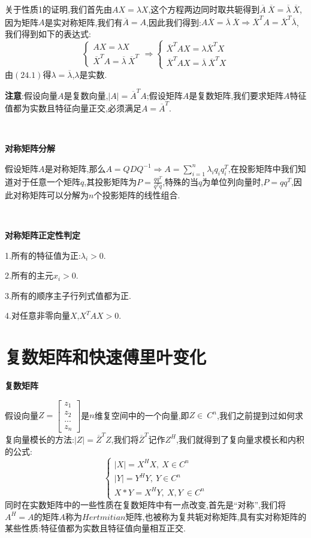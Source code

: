 \documentclass[oneside]{book}
\begin{document}
	关于性质1的证明,我们首先由$AX=\lambda X$,这个方程两边同时取共轭得到$\overline{A}\ \overline{X}=\overline{\lambda}\ \overline{X}$,因为矩阵$A$是实对称矩阵,我们有$\overline{A}=A$,因此我们得到:$A\overline{X}=\overline{\lambda}\ \overline{X}\Rightarrow \overline{X}^{T}A=\overline{X}^{T}\overline{\lambda}$,我们得到如下的表达式:
	\begin{equation}
		\left\{\begin{array}{c}
			AX=\lambda X\\\overline{X}^{T}A=\overline{\lambda}\  \overline{X}^{T}
		\end{array}\right.\Rightarrow \left\{\begin{array}{c}
		\overline{X}^{T}AX=\lambda \overline{X}^{T}X\\\overline{X}^{T}AX=\overline{\lambda}\  \overline{X}^{T}X
	\end{array}\right.
	\end{equation}
	由$(24.1)$得$\lambda=\overline{\lambda}$,$\lambda$是实数.
	
	\textbf{注意}:假设向量$A$是复数向量,$|A|=\overline{A}^{T}A$;假设矩阵$A$是复数矩阵,我们要求矩阵$A$特征值都为实数且特征向量正交,必须满足$A=\overline{A}^{T}$.
	
	\hspace{\fill}\
	
	\textbf{对称矩阵分解}
	
	假设矩阵$A$是对称矩阵,那么$A=QDQ^{-1}\Rightarrow A=\sum_{i=1}^{n}\lambda_{i}q_{i}q_{i}^{T}$,在投影矩阵中我们知道对于任意一个矩阵$q$,其投影矩阵为$P=\frac{qq^{T}}{q^{T}q}$,特殊的当$q$为单位列向量时,$P=qq^{T}$,因此对称矩阵可以分解为$n$个投影矩阵的线性组合.
	
	\hspace{\fill}\
	
	\textbf{对称矩阵正定性判定}
	
	1.所有的特征值为正:$\lambda_{i}>0$.
	
	2.所有的主元$x_{i}>0$.
	
	3.所有的顺序主子行列式值都为正.
	
	4.对任意非零向量$X$,$X^{T}AX>0$.
	\chapter{复数矩阵和快速傅里叶变化}
	\textbf{复数矩阵}
	
	假设向量$Z=\left[\begin{array}{c}
	z_{1}\\z_{2}\\...\\z_{n}
	\end{array}\right]$是$n$维复空间中的一个向量,即$Z \in\  C^{n}$,我们之前提到过如何求复向量模长的方法:$|Z|=\overline{Z}^{T}Z$,我们将$\overline{Z}^{T}$记作$Z^{H}$,我们就得到了复向量求模长和内积的公式:
	$$\left\{\begin{array}{c}
		|X|=X^{H}X,\ X\in C^{n}\\|Y|=Y^{H}Y,\ Y\in C^{n}\\X*Y=X^{H}Y,\ X,Y\ \in C^{n}
	\end{array}\right.$$
	同时在实数矩阵中的一些性质在复数矩阵中有一点改变,首先是“对称”,我们将$A^{H}=A$的矩阵$A$称为$Hertmitian$矩阵,也被称为复共轭对称矩阵,具有实对称矩阵的某些性质:特征值都为实数且特征值向量相互正交.
	
\end{document}
